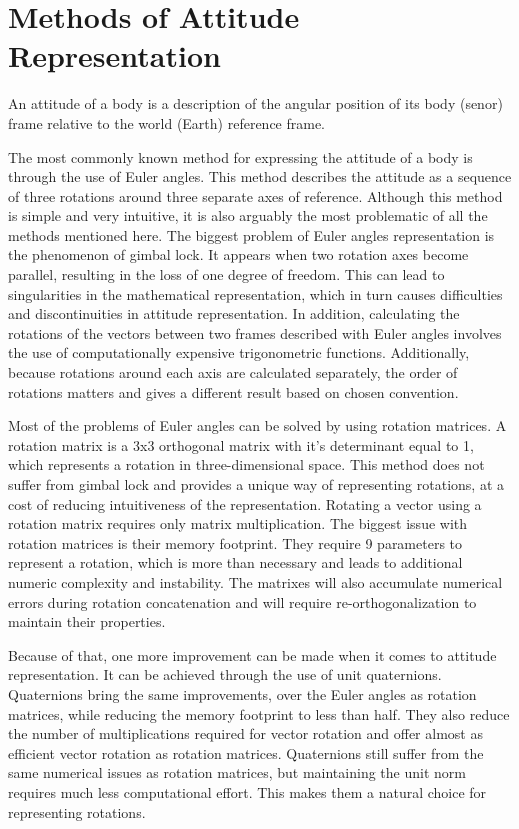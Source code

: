 \chapter{Methods of Attitude Representation}

An attitude of a body is a description of the angular position of its body (senor) frame relative to the world (Earth) reference frame.

The most commonly known method for expressing the attitude of a body is through the use of Euler angles. This method describes the attitude as a sequence of three rotations around three separate axes of reference. Although this method is simple and very intuitive, it is also arguably the most problematic of all the methods mentioned here. The biggest problem of Euler angles representation is the phenomenon of gimbal lock. It appears when two rotation axes become parallel, resulting in the loss of one degree of freedom. This can lead to singularities in the mathematical representation, which in turn causes difficulties and discontinuities in attitude representation. In addition, calculating the rotations of the vectors between two frames described with Euler angles involves the use of computationally expensive trigonometric functions.
Additionally, because rotations around each axis are calculated separately, the order of rotations matters and gives a different result based on chosen convention.

Most of the problems of Euler angles can be solved by using rotation matrices. A rotation matrix is a 3x3 orthogonal matrix with it's determinant equal to 1, which represents a rotation in three-dimensional space. This method does not suffer from gimbal lock and provides a unique way of representing rotations, at a cost of reducing intuitiveness of the representation. Rotating a vector using a rotation matrix requires only matrix multiplication. The biggest issue with rotation matrices is their memory footprint. They require 9 parameters to represent a rotation, which is more than necessary and leads to additional numeric complexity and instability. The matrixes will also accumulate numerical errors during rotation concatenation and will require re-orthogonalization to maintain their properties.

Because of that, one more improvement can be made when it comes to attitude representation. It can be achieved through the use of unit quaternions. Quaternions bring the same improvements, over the Euler angles as rotation matrices, while reducing the memory footprint to less than half. They also reduce the number of multiplications required for vector rotation and offer almost as efficient vector rotation as rotation matrices. Quaternions still suffer from the same numerical issues as rotation matrices, but maintaining the unit norm requires much less computational effort. This makes them a natural choice for representing rotations.


